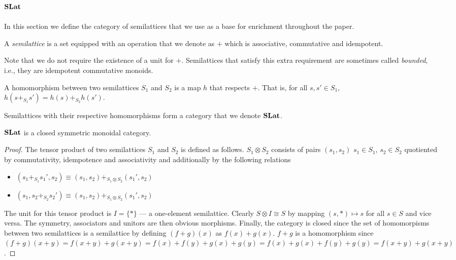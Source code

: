 \subsection{$\mathbf{SLat}$}
\label{sec:appendix:slat}

In this section we define the category of semilattices that we use as a base for enrichment throughout the paper.

\begin{definition}[Semilattice]
    A \textit{semilattice} is a set equipped with an operation that we denote as $+$ which is associative, commutative and idempotent.
  \end{definition}
  
  Note that we do not require the existence of a unit for $+$. 
  Semilattices that satisfy this extra requirement are sometimes called \textit{bounded}, i.e., they are idempotent commutative monoids.
  
  \begin{definition}
  
  A homomorphism between two semilattices $S_{1}$ and $S_{2}$ is a map $h$ that respects $+$.
  That is, for all $s,s' \in S_{1}$, $h(s +_{S_{1}} s') = h(s) +_{S_{2}} h(s')$.
  \end{definition}
  
  \begin{definition}
    
  Semilattices with their respective homomorphisms form a category that we denote $\mathbf{SLat}$.
  \end{definition}
  
  \begin{proposition}
    $\mathbf{SLat}$ is a closed symmetric monoidal category.
  \end{proposition}
  \begin{proof}
    The tensor product of two semilattices $S_{1}$ and $S_{2}$ is defined as follows.
    $S_{1} \otimes S_{2}$ consists of pairs $(s_1,s_2)$ $s_{1} \in S_{1}$, $s_{2} \in S_{2}$ quotiented by commutativity, idempotence and associativity and additionally by the following relations
    \begin{itemize}
      \item $(s_{1} +_{S_{1}} s_{1}',s_{2}) \equiv (s_{1},s_{2}) +_{S_{1} \otimes S_{2}} (s_{1}',s_{2})$
      \item $(s_{1}, s_{2} +_{S_{2}} s_{2}') \equiv (s_{1},s_{2}) +_{S_{1} \otimes S_{2}} (s_{1}',s_{2})$
    \end{itemize}
  
    The unit for this tensor product is $I = \{*\}$ --- a one-element semilattice.
    Clearly $S \otimes I \cong S$ by mapping $(s,*) \mapsto s$ for all $s \in S$ and vice versa.
    The symmetry, associators and unitors are then obvious morphisms.
    Finally, the category is closed since the set of homomorpisms between two semilattices is a semilattice by defining $(f + g)(x)$ as $f(x) + g(x)$.
    $f + g$ is a homomorphism since $(f + g)(x+y) = f(x+y) + g(x+y) = f(x) + f(y) + g(x) + g(y) = f(x) + g(x) + f(y) + g(y) = f(x+y) + g(x+y)$.
  \end{proof}
  
